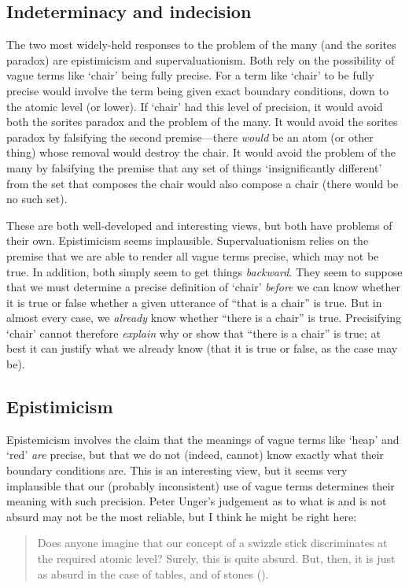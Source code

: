 \documentclass[11pt]{article}
\newenvironment{squote}{%
	\begin{quote}\begin{singlespace}%
	}{%
	\end{singlespace}\end{quote}}
\begin{document}
\begin{spacing}{1.5}
\subsection{Indeterminacy and indecision}
The two most widely-held responses to the problem of the many (and the
sorites paradox) are epistimicism and supervaluationism.  Both rely on
the possibility of vague terms like `chair' being fully precise.  For
a term like `chair' to be fully precise would involve the term being
given exact boundary conditions, down to the atomic level (or lower).
If `chair' had this level of precision, it would avoid both the
sorites paradox and the problem of the many.  It would avoid the
sorites paradox by falsifying the second premise---there {\em would}
be an atom (or other thing) whose removal would destroy the chair.  It
would avoid the problem of the many by falsifying the premise that any
set of things `insignificantly different' from the set that composes
the chair would also compose a chair (there would be no such set).

These are both well-developed and interesting views, but both have
problems of their own.  Epistimicism seems implausible.
Supervaluationism relies on the premise that we are able to render all
vague terms precise, which may not be true.  In addition, both simply
seem to get things {\em backward}.  They seem to suppose that we must
determine a precise definition of `chair' {\em before} we can know
whether it is true or false whether a given utterance of ``that is a
chair'' is true.  But in almost every case, we {\em already} know
whether ``there is a chair'' is true.  Precisifying `chair' cannot
therefore {\em explain} why or show that ``there is a chair'' is true;
at best it can justify what we already know (that it is true or false,
as the case may be).

\subsection{Epistimicism}
Epistemicism involves the claim that the meanings of vague terms like
`heap' and `red' {\em are} precise, but that we do not (indeed,
cannot) know exactly what their boundary conditions are.  This is an
interesting view, but it seems very implausible that our (probably
inconsistent) use of vague terms determines their meaning with such
precision.  Peter Unger's judgement as to what is and is not absurd
may not be the most reliable, but I think he might be right here:

    \begin{squote}
      Does anyone imagine that our concept of a swizzle stick
      discriminates at the required atomic level?  Surely, this is
      quite absurd.  But, then, it is just as absurd in the case of
      tables, and of stones (\citeyear[126]{unger1979}).
    \end{squote}


\end{spacing}
\end{document}

